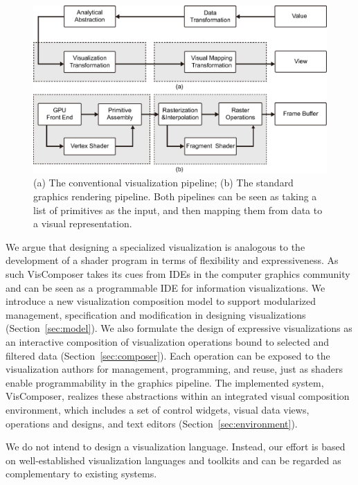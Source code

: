 \begin{figure}
\includegraphics[width=0.99\linewidth]{images/pipelineComparison.eps}
  \caption{(a) The conventional visualization pipeline; (b) The standard graphics rendering pipeline. Both pipelines can be seen as taking a list of primitives as the input, and then mapping them from data to a visual representation.  } \label{fg:pipeline}
\end{figure}

We argue that designing a specialized visualization is analogous to the development of a shader program in terms of flexibility and expressiveness. As such VisComposer takes its cues from IDEs in the computer graphics community and can be seen as a programmable IDE for information visualizations. We introduce a new visualization composition model to support modularized management, specification and modification in designing visualizations (Section~\ref{sec:model}).  We also formulate the design of expressive visualizations as an interactive composition of visualization operations bound to selected and filtered data (Section~\ref{sec:composer}). Each operation can be exposed to the visualization authors for management, programming, and reuse, just as shaders enable programmability in the graphics pipeline.    The implemented system, VisComposer, realizes these abstractions within an integrated visual composition environment, which includes a set of control widgets, visual data views, operations and designs, and text editors (Section~\ref{sec:environment}).

We do not intend to design a visualization language. Instead, our effort is based on well-established visualization languages and toolkits and can be regarded as complementary to existing systems. %
